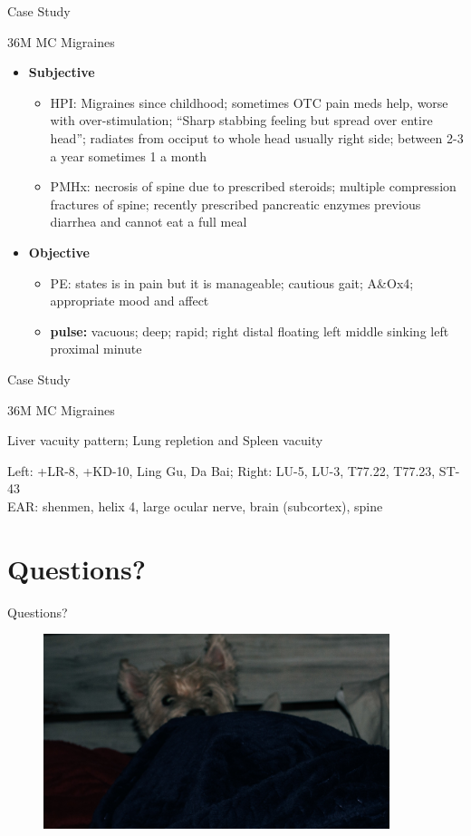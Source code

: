 \begin{frame}{Case Study}

36M MC Migraines

\begin{itemize}
\item \textbf{Subjective}
\begin{itemize}
\item HPI: Migraines since childhood; sometimes OTC pain meds help, worse with over-stimulation; ``Sharp stabbing feeling but spread over entire head''; radiates from occiput to whole head usually right side; between 2-3 a year sometimes 1 a month
\item PMHx: necrosis of spine due to prescribed steroids; multiple compression fractures of spine; recently prescribed pancreatic enzymes previous diarrhea and cannot eat a full meal
\end{itemize}
\item \textbf{Objective}
\begin{itemize}
\item PE: states is in pain but it is manageable; cautious gait; A\&Ox4; appropriate mood and affect
\item \textbf{pulse:} vacuous; deep; rapid; right distal floating left middle sinking left proximal minute
\end{itemize}
\end{itemize}

\end{frame}

\begin{frame}{Case Study}

36M MC Migraines  

\begin{as}
Liver vacuity pattern; Lung repletion and Spleen vacuity
\end{as}

\vspace{1em}

\begin{pln}
Left: +LR-8, +KD-10, Ling Gu, Da Bai; Right: LU-5, LU-3, T77.22, T77.23, ST-43\\
EAR: shenmen, helix 4, large ocular nerve, brain (subcortex), spine
\end{pln}

\end{frame}

\section{Questions?} 

\begin{frame}{Questions?}
  \begin{figure}
    \centering
    \includegraphics[width=0.9\textwidth]{img/westie02.jpg}
  \end{figure}
\end{frame}


